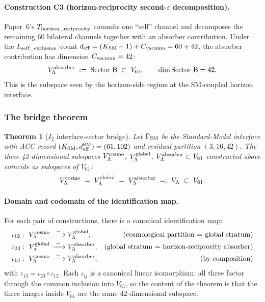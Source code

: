 \documentclass[11pt]{article}
\theoremstyle{plain}
\newtheorem{theorem}{Theorem}[section]
\theoremstyle{definition}
\theoremstyle{remark}
\begin{document}
\paragraph{Construction C3 (horizon-reciprocity second-$\varepsilon$ decomposition).}
Paper~6's $T_{\rm horizon\_reciprocity}$ commits one ``self'' channel and decomposes the remaining 60 bilateral channels together with an absorber contribution.  Under the $L_{\rm self\_exclusion}$ count $d_{\rm eff} = (K_{\rm SM} - 1) + C_{\rm vacuum} = 60 + 42$, the absorber contribution has dimension $C_{\rm vacuum} = 42$:
\[
  V_\Lambda^{\rm absorber} \;:=\; \text{Sector B} \;\subset\; V_{61},
  \qquad
  \dim \text{Sector B} = 42.
\]
This is the subspace seen by the horizon-side regime at the SM-coupled horizon interface.

\subsubsection*{The bridge theorem}

\begin{theorem}[$I_2$ interface-sector bridge]\label{thm:I2_bridge}
Let $\Gamma_{\rm SM}$ be the Standard-Model interface with ACC record $(K_{\rm SM}, d_{\rm eff}^{\rm SM}) = (61, 102)$ and residual partition $(3, 16, 42)$.  The three 42-dimensional subspaces $V_\Lambda^{\rm cosmo}$, $V_\Lambda^{\rm global}$, $V_\Lambda^{\rm absorber} \subset V_{61}$ constructed above coincide as subspaces of $V_{61}$:
\[
  V_\Lambda^{\rm cosmo} \;=\; V_\Lambda^{\rm global} \;=\; V_\Lambda^{\rm absorber}
  \;=:\; V_\Lambda \;\subset\; V_{61}.
\]
\end{theorem}

\paragraph{Domain and codomain of the identification map.}  For each pair of constructions, there is a canonical identification map:
\begin{align}
  \iota_{12}:\ V_\Lambda^{\rm cosmo} &\xrightarrow{\ \sim\ } V_\Lambda^{\rm global},
    &\text{(cosmological partition = global stratum)} \label{eq:iota12}\\
  \iota_{23}:\ V_\Lambda^{\rm global} &\xrightarrow{\ \sim\ } V_\Lambda^{\rm absorber},
    &\text{(global stratum = horizon-reciprocity absorber)} \label{eq:iota23}\\
  \iota_{13}:\ V_\Lambda^{\rm cosmo} &\xrightarrow{\ \sim\ } V_\Lambda^{\rm absorber},
    &\text{(by composition)} \label{eq:iota13}
\end{align}
with $\iota_{13} = \iota_{23} \circ \iota_{12}$.  Each $\iota_{ij}$ is a canonical linear isomorphism; all three factor through the common inclusion into $V_{61}$, so the content of the theorem is that the three images inside $V_{61}$ are the same 42-dimensional subspace.
\end{document}
